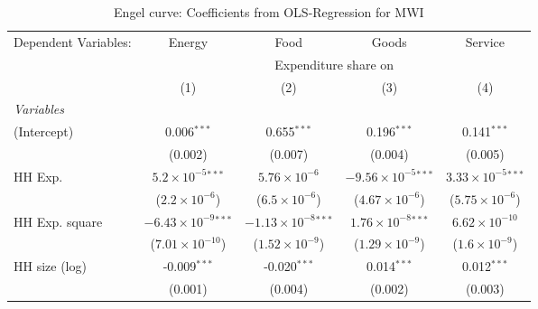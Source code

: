 
\begin{table}[htbp!]
   \centering
   \small
   \begin{adjustbox}{width = 1\textwidth, max height = 0.95\textheight, center}
      \begin{threeparttable}[b]
         \caption{\label{tab:Engel_parametric_MWI} Engel curve: Coefficients from OLS-Regression for MWI}
         \begin{tabular}{lcccc}
            \tabularnewline \midrule \midrule
            Dependent Variables: & Energy                         & Food                           & Goods                          & Service\\  
             & \multicolumn{4}{c}{Expenditure share on} \\ 
                                 & (1)                            & (2)                            & (3)                            & (4)\\  
            \midrule
            \emph{Variables}\\
            (Intercept)          & 0.006$^{***}$                  & 0.655$^{***}$                  & 0.196$^{***}$                  & 0.141$^{***}$\\   
                                 & (0.002)                        & (0.007)                        & (0.004)                        & (0.005)\\   
            HH Exp.              & $5.2\times 10^{-5}$$^{***}$    & $5.76\times 10^{-6}$           & $-9.56\times 10^{-5}$$^{***}$  & $3.33\times 10^{-5}$$^{***}$\\    
                                 & ($2.2\times 10^{-6}$)          & ($6.5\times 10^{-6}$)          & ($4.67\times 10^{-6}$)         & ($5.75\times 10^{-6}$)\\    
            HH Exp. square       & $-6.43\times 10^{-9}$$^{***}$  & $-1.13\times 10^{-8}$$^{***}$  & $1.76\times 10^{-8}$$^{***}$   & $6.62\times 10^{-10}$\\    
                                 & ($7.01\times 10^{-10}$)        & ($1.52\times 10^{-9}$)         & ($1.29\times 10^{-9}$)         & ($1.6\times 10^{-9}$)\\    
            HH size (log)        & -0.009$^{***}$                 & -0.020$^{***}$                 & 0.014$^{***}$                  & 0.012$^{***}$\\   
                                 & (0.001)                        & (0.004)                        & (0.002)                        & (0.003)\\   

\end{tabular}
\end{threeparttable}
\end{adjustbox}
\end{table}

